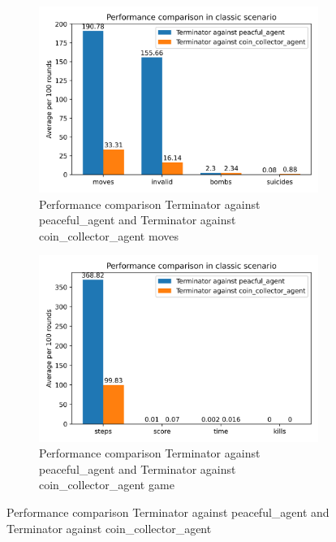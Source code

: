 \documentclass[
	letterpaper, %
	12pt, %
]{CSUniSchoolLabReport}
\begin{document}
\begin{figure}[H]

	\begin{subfigure}{\textwidth}
		\centering
		\includegraphics[scale=0.6]{Figures/Task3-1.png}
		\caption{Performance comparison Terminator against peaceful\_agent and Terminator against coin\_collector\_agent moves}
		\label{img:Task3-1}
	\end{subfigure}

	\begin{subfigure}{\textwidth}
		\centering
		\includegraphics[scale=0.6]{Figures/Task3-2.png}
		\caption{Performance comparison Terminator against peaceful\_agent and Terminator against coin\_collector\_agent game}
		\label{img:Task3-2}
	\end{subfigure}

	\caption{Performance comparison Terminator against peaceful\_agent and Terminator against coin\_collector\_agent}
	\label{img:Task3}

\end{figure}
\end{document}
